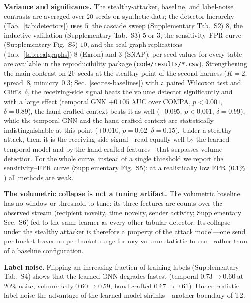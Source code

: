 \smallskip\noindent\textbf{Variance and significance.} The stealthy-attacker, baseline, and label-noise
contrasts are averaged over $20$ seeds on synthetic data; the detector hierarchy (Tab.~\ref{tab:detectors})
uses $5$, the cascade sweep (Supplementary Tab.~S2) $8$, the inductive validation (Supplementary Tab.~S3)
$5$ or $3$, the sensitivity--FPR curve (Supplementary Fig.~S5) $10$, and the real-graph replications
(Tab.~\ref{tab:realgraphs}) $8$ (Enron) and $3$ (SNAP); per-seed values for every table are
available in the reproducibility package (\texttt{code/results/*.csv}). Strengthening the main contrast on
$20$~seeds at the stealthy point of the second harness ($K{=}2$, spread~$8$, mimicry~$0.3$;
Sec.~\ref{sec:res-baselines}) with a paired Wilcoxon test and Cliff's~$\delta$, the receiving-side signal
beats the volume detector significantly and with a large effect (temporal GNN $+0.105$ AUC over COMPA,
$p<0.001$, $\delta{=}0.89$), the hand-crafted context beats it as well ($+0.095$, $p<0.001$,
$\delta{=}0.99$), while the temporal GNN and the hand-crafted context are statistically indistinguishable
at this point ($+0.010$, $p{=}0.62$, $\delta{=}0.15$). Under a stealthy attack, then, it is the
receiving-side signal---read equally well by the learned temporal model and by the hand-crafted
features---that surpasses volume detection. For the whole curve, instead of a single threshold we report the
sensitivity--FPR curve (Supplementary Fig.~S5): at a realistically low FPR ($0.1\%$) all methods are weak.

\smallskip\noindent\textbf{The volumetric collapse is not a tuning artifact.} The volumetric baseline has no
window or threshold to tune: its three features are counts over the observed stream (recipient novelty, time
novelty, sender activity; Supplementary Sec.~S6) fed to the same learner as every other tabular detector.
Its collapse under the stealthy attacker is therefore a property of the attack model---one send per bucket
leaves no per-bucket surge for any volume statistic to see---rather than of a baseline configuration.

\smallskip\noindent\textbf{Label noise.} Flipping an increasing fraction of training labels (Supplementary
Tab.~S4) shows that the learned GNN degrades fastest (temporal $0.73\!\to\!0.60$ at $20\%$ noise, volume only
$0.60\!\to\!0.59$, hand-crafted $0.67\!\to\!0.61$). Under realistic label noise the advantage of the learned model shrinks---another boundary
of T2.

